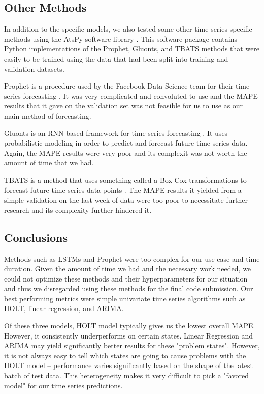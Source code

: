 \documentclass[sigconf,nonacm]{acmart}
\begin{document}
\subsection{Other Methods}

In addition to the specific models, we also tested some other time-series
specific methods using the AtsPy software library \cite{atspy}. This software
package contains Python implementations of the Prophet, Gluonts, and TBATS methods 
that were easily to be trained using the data that had been split into training
and validation datasets.

Prophet is a procedure used by the Facebook Data Science team for their time 
series forecasting \cite{Prophet}. It was very complicated and convoluted to 
use and the MAPE results that it gave on the validation set was not feasible 
for us to use as our main method of forecasting.

Gluonts is an RNN based framework for time series forecasting \cite{Gluonts}. It uses
probabilistic modeling in order to predict and forecast future time-series
data. Again, the MAPE results were very poor and its complexit was not worth
the amount of time that we had.

TBATS is a method that uses something called a Box-Cox transformations to
forecast future time series data points \cite{TBATS}. The MAPE results it
yielded from a simple validation on the last week of data were too  poor to
necessitate further research and its complexity further hindered it.


\subsection{Conclusions}

Methods such as LSTMs and Prophet were too complex for our use case and time
duration. Given the amount of time we had and the necessary work needed, we
could not optimize these methods and their hyperparameters for our situation
and thus we disregarded using these methods for the final code submission.
Our best performing metrics were simple univariate time series algorithms such
as HOLT, linear regression, and ARIMA. 

Of these three models, HOLT model typically gives us the lowest overall MAPE.
However, it consistently underperforms on certain states. Linear Regression and
ARIMA may yield significantly better results for these "problem states".
However, it is not always easy to tell which states are going to cause problems
with the HOLT model -- performance varies significantly based on the shape of
the latest batch of test data. This heterogeneity makes it very difficult to
pick a "favored model" for our time series predictions. 
\end{document}
